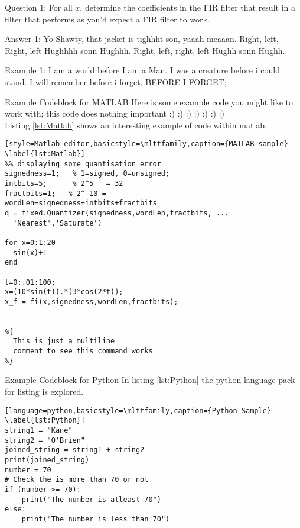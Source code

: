 \begin{question}{Question 1:}
  For all $x$, determine the coefficients in the FIR filter that result in a filter that performs as you'd expect a FIR filter to work.
\end{question}

\begin{answer}{Answer 1:}
Yo Shawty, that jacket is tighhht son, yaaah meaaan. Right, left, Right, left Hughhhh sonn Hughhh. Right, left, right, left Hughh sonn Hughh.
\end{answer}

\begin{example}{Example 1:}
I am a world before I am a Man. I was a creature before i could stand. I will remember before i forget. BEFORE I FORGET;
\end{example}

\begin{codeblock}{Example Codeblock for MATLAB}
Here is some example code you might like to work with; this code does nothing important :) :) :) :) :) :) :)\\

Listing \ref{lst:Matlab} shows an interesting example of code within matlab.
\begin{lstlisting}[style=Matlab-editor,basicstyle=\mlttfamily,caption={MATLAB sample} \label{lst:Matlab}]
%% displaying some quantisation error
signedness=1;   % 1=signed, 0=unsigned;
intbits=5;      % 2^5   = 32
fractbits=1;   % 2^-10 =
wordLen=signedness+intbits+fractbits
q = fixed.Quantizer(signedness,wordLen,fractbits, ...
  'Nearest','Saturate')

for x=0:1:20
  sin(x)+1
end

t=0:.01:100;
x=(10*sin(t)).*(3*cos(2*t));
x_f = fi(x,signedness,wordLen,fractbits);


%{
  This is just a multiline
  comment to see this command works
%}
\end{lstlisting}
\end{codeblock}



\begin{codeblock}{Example Codeblock for Python}
In listing \ref{lst:Python} the python language pack for listing is explored.

\begin{lstlisting}[language=python,basicstyle=\mlttfamily,caption={Python Sample} \label{lst:Python}]
string1 = "Kane"
string2 = "O'Brien"
joined_string = string1 + string2
print(joined_string)
number = 70
# Check the is more than 70 or not
if (number >= 70):
    print("The number is atleast 70")
else:
    print("The number is less than 70")
\end{lstlisting}
\end{codeblock}
\clearpage
